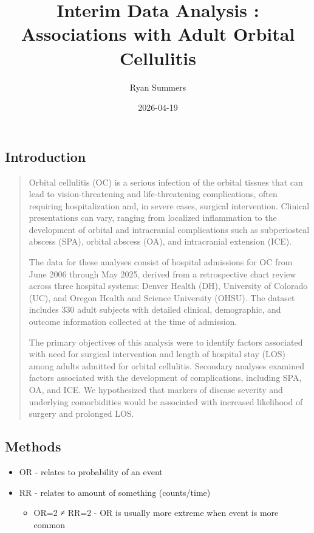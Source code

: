 \documentclass[
]{article}
\title{Interim Data Analysis : Associations with Adult Orbital Cellulitis}
\author{Ryan Summers}
\date{2026-04-19}
\providecommand{\tightlist}{%
  \setlength{\itemsep}{0pt}\setlength{\parskip}{0pt}}
\begin{document}
\maketitle

{
\setcounter{tocdepth}{2}
\tableofcontents
}
\subsection{Introduction}\label{introduction}

\begin{quote}
Orbital cellulitis (OC) is a serious infection of the orbital tissues that can lead to vision-threatening and life-threatening complications, often requiring hospitalization and, in severe cases, surgical intervention. Clinical presentations can vary, ranging from localized inflammation to the development of orbital and intracranial complications such as subperiosteal abscess (SPA), orbital abscess (OA), and intracranial extension (ICE).

The data for these analyses consist of hospital admissions for OC from June 2006 through May 2025, derived from a retrospective chart review across three hospital systems: Denver Health (DH), University of Colorado (UC), and Oregon Health and Science University (OHSU). The dataset includes 330 adult subjects with detailed clinical, demographic, and outcome information collected at the time of admission.

The primary objectives of this analysis were to identify factors associated with need for surgical intervention and length of hospital stay (LOS) among adults admitted for orbital cellulitis. Secondary analyses examined factors associated with the development of complications, including SPA, OA, and ICE. We hypothesized that markers of disease severity and underlying comorbidities would be associated with increased likelihood of surgery and prolonged LOS.
\end{quote}

\subsection{Methods}\label{methods}

\begin{itemize}
\tightlist
\item
  OR - relates to probability of an event
\item
  RR - relates to amount of something (counts/time)

  \begin{itemize}
  \tightlist
  \item
    OR=2 ≠ RR=2 - OR is usually more extreme when event is more common
  \end{itemize}
\end{itemize}
\end{document}
